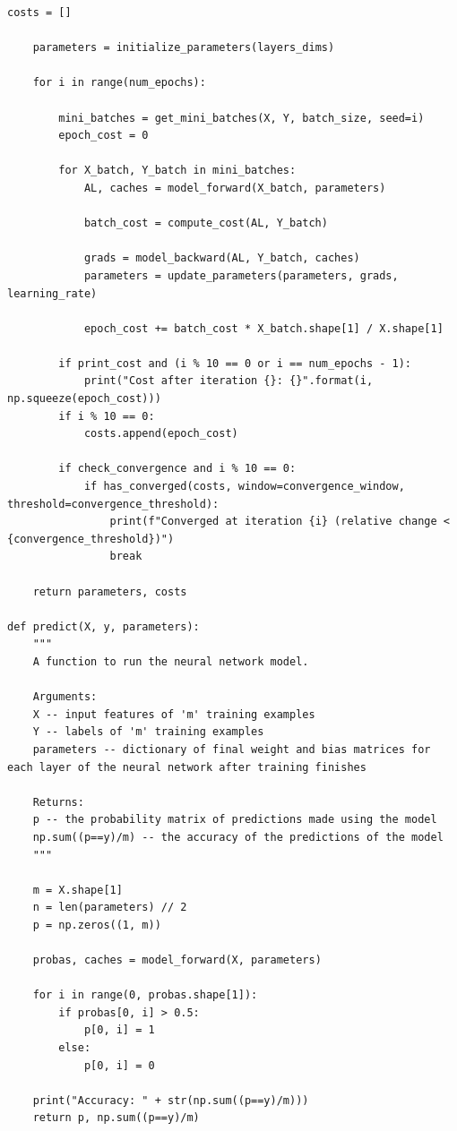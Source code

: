 \documentclass{article}
\begin{document}
\begin{lstlisting}[caption={Neural network functions - NN\_helper\_functions.py}]
    costs = []

    parameters = initialize_parameters(layers_dims)
    
    for i in range(num_epochs):

        mini_batches = get_mini_batches(X, Y, batch_size, seed=i)
        epoch_cost = 0

        for X_batch, Y_batch in mini_batches:
            AL, caches = model_forward(X_batch, parameters)

            batch_cost = compute_cost(AL, Y_batch)

            grads = model_backward(AL, Y_batch, caches)
            parameters = update_parameters(parameters, grads, learning_rate)

            epoch_cost += batch_cost * X_batch.shape[1] / X.shape[1]
        
        if print_cost and (i % 10 == 0 or i == num_epochs - 1):
            print("Cost after iteration {}: {}".format(i, np.squeeze(epoch_cost)))
        if i % 10 == 0:
            costs.append(epoch_cost)
        
        if check_convergence and i % 10 == 0:
            if has_converged(costs, window=convergence_window, threshold=convergence_threshold):
                print(f"Converged at iteration {i} (relative change < {convergence_threshold})")
                break
    
    return parameters, costs

def predict(X, y, parameters):
    """
    A function to run the neural network model.

    Arguments:
    X -- input features of 'm' training examples
    Y -- labels of 'm' training examples
    parameters -- dictionary of final weight and bias matrices for each layer of the neural network after training finishes

    Returns:
    p -- the probability matrix of predictions made using the model
    np.sum((p==y)/m) -- the accuracy of the predictions of the model
    """

    m = X.shape[1]
    n = len(parameters) // 2
    p = np.zeros((1, m))

    probas, caches = model_forward(X, parameters)

    for i in range(0, probas.shape[1]):
        if probas[0, i] > 0.5:
            p[0, i] = 1
        else:
            p[0, i] = 0
    
    print("Accuracy: " + str(np.sum((p==y)/m)))
    return p, np.sum((p==y)/m)

\end{lstlisting}
\end{document}
